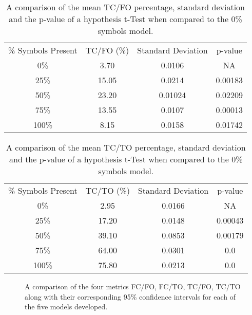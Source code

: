 \begin{table}[p]
	\center
	\caption{A comparison of the mean TC/FO percentage, standard deviation and the p-value of a hypothesis t-Test when compared to the 0\% symbols model.}
	\label{tab:experiment-3-results-table-tcfo}
	\begin{tabular}{ |c|c|c|c| } 
		\hline
		\% Symbols Present & TC/FO (\%) & Standard Deviation  & p-value\\ 
		0\% & 3.70 & 0.0106 & NA \\  
		25\% & 15.05 & 0.0214 & 0.00183\\  
		50\% & 23.20 & 0.01024 & 0.02209 \\  
		75\% & 13.55 & 0.0107 & 0.00013\\  
		100\% & 8.15 & 0.0158 & 0.01742\\  
		\hline
	\end{tabular}
\end{table}

\begin{table}[p]
	\center
	\caption{A comparison of the mean TC/TO percentage, standard deviation and the p-value of a hypothesis t-Test when compared to the 0\% symbols model.}
	\label{tab:experiment-3-results-table-tcto}
	\begin{tabular}{ |c|c|c|c| } 
		\hline
		\% Symbols Present & TC/TO (\%) & Standard Deviation  & p-value\\ 
		0\% & 2.95 & 0.0166 & NA \\  
		25\% & 17.20 & 0.0148 & 0.00043\\  
		50\% & 39.10 & 0.0853 & 0.00179 \\  
		75\% & 64.00 & 0.0301 & 0.0\\  
		100\% & 75.80 & 0.0213 & 0.0\\  
		\hline
	\end{tabular}
\end{table}

\begin{figure}[p]%
	\centering
	\label{fig:experiment-3-results-chart-fc-fo}%
	\label{fig:experiment-3-results-chart-fc-to}%
	
	\label{fig:experiment-3-results-chart-tc-fo}%
	\label{fig:experiment-3-results-chart-tc-to}%
	\caption{A comparison of the four metrics FC/FO, FC/TO, TC/FO, TC/TO along with their corresponding 95\% confidence intervals for each of the five models developed.}%
	\label{fig:experiment-3-results-chart}%
\end{figure}

